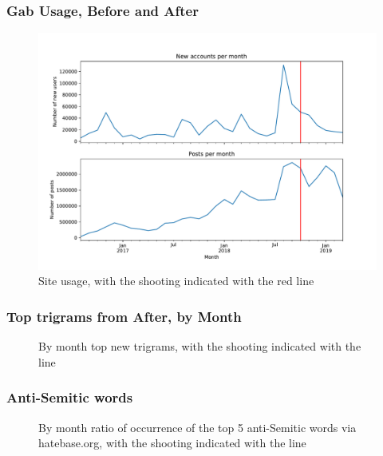 \documentclass{beamer}
\begin{document}
\begin{frame}
\frametitle{Gab Usage, Before and After }
\begin{figure}
	\centering
	\includegraphics[width=.85\textwidth]{Before_and_after_counts.pdf}
	\caption{Site usage, with the shooting indicated with the red line}
\end{figure}
\end{frame}	

\begin{frame}
\frametitle{Top trigrams from After, by Month}
\begin{figure}
	\centering
	\caption{By month top new trigrams, with the shooting indicated with the line}
\end{figure}
\end{frame}	
\begin{frame}


\frametitle{Anti-Semitic words}
\begin{figure}
\centering
{}
\caption{By month ratio of occurrence of the top 5 anti-Semitic words via hatebase.org, with the shooting indicated with the  line}
\end{figure}
\end{frame}	
\end{document}
